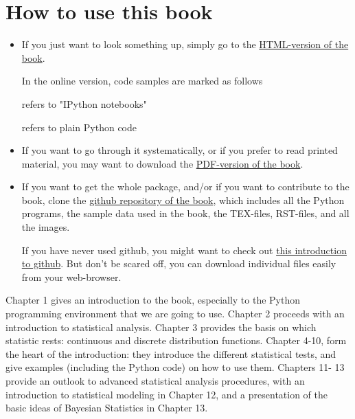\section*{How to use this book}

\begin{itemize}
  \item If you just want to look something up, simply go to the \href{http://work.thaslwanter.at/Stats/html} {HTML-version of the book}.

   In the online version, code samples are marked as follows

     refers to "IPython notebooks"

     refers to plain Python code

  \item If you want to go through it systematically, or if you prefer to read
   printed material, you may want to download the \href{http://work.thaslwanter.at/Stats/StatsIntro.pdf} {PDF-version of the book}.

  \item If you want to get the whole package, and/or if you want to
   contribute to the book, clone the  \href{https://github.com/thomas-haslwanter/statsintro} {github repository of the
   book}, which  includes all the Python programs, the sample data used in the book,
   the TEX-files, RST-files, and all the images.

   If you have never used github, you might want to check out \href{https://help.github.com/articles/set-up-git} {this
   introduction to  github}. But don't be  scared off, you can download individual files easily from your
   web-browser.

\end{itemize}

Chapter 1 gives an introduction to the book, especially to the Python programming environment that we are going to use. Chapter 2 proceeds with an introduction to statistical analysis. Chapter 3 provides the basis on which statistic rests: continuous and discrete distribution functions. Chapter 4-10, form the heart of the introduction: they introduce the different statistical tests, and give examples (including the Python code) on how to use them. Chapters 11- 13 provide an outlook to advanced statistical analysis procedures, with an introduction to statistical modeling in Chapter 12, and a presentation of the basic ideas of Bayesian Statistics in Chapter 13.

